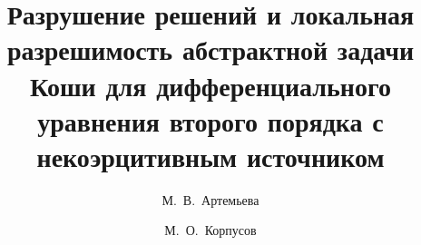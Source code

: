

\usepackage{todonotes} %

\usepackage[russian]{nla}

%
%


%




%
\fi

\title{Разрушение решений и локальная разрешимость абстрактной задачи Коши для дифференциального уравнения второго порядка с некоэрцитивным источником}
\author{М.~В.~Артемьева  %
  \and  %
  М.~О.~Корпусов 
  \and
} %


